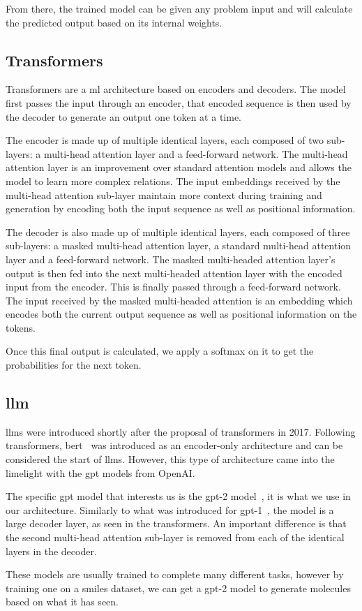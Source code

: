 \documentclass[../Document.tex]{subfiles}
\begin{document}
From there, the trained model can be given any problem input and will calculate the predicted output based on its internal weights.


\subsection{Transformers}
Transformers\cite{vaswani2017attention} are a \gls{ml} architecture based on encoders and decoders. The model first passes the input through an encoder, that encoded sequence is then used by the decoder to generate an output one token at a time.

The encoder is made up of multiple identical layers, each composed of two sub-layers: a multi-head attention layer and a feed-forward network.
The multi-head attention layer is an improvement over standard attention models and allows the model to learn more complex relations.
The input embeddings received by the multi-head attention sub-layer maintain more context during training and generation by encoding both the input sequence as well as positional information.

The decoder is also made up of multiple identical layers, each composed of three sub-layers: a masked multi-head attention layer, a standard multi-head attention layer and a feed-forward network.
The masked multi-headed attention layer's output is then fed into the next multi-headed attention layer with the encoded input from the encoder. This is finally passed through a feed-forward network.
The input received by the masked multi-headed attention is an embedding which encodes both the current output sequence as well as positional information on the tokens.

Once this final output is calculated, we apply a softmax on it to get the probabilities for the next token.  


\subsection{\acrlong{llm}}
\glspl{llm} were introduced shortly after the proposal of transformers in 2017. Following transformers, \gls{bert}~\cite{devlin2019bert} was introduced as an encoder-only architecture and can be considered the start of \glspl{llm}. However, this type of architecture came into the limelight with the \gls{gpt} models from OpenAI.

The specific \gls{gpt} model that interests us is the \gls{gpt}-2 model~\cite{radford2019language}, it is what we use in our architecture. Similarly to what was introduced for \gls{gpt}-1~\cite{radford2018improving}, the model is a large decoder layer, as seen in the transformers.
An important difference is that the second multi-head attention sub-layer is removed from each of the identical layers in the decoder.

These models are usually trained to complete many different tasks, however by training one on a \gls{smiles} dataset, we can get a \gls{gpt}-2 model to generate molecules based on what it has seen.
\end{document}

